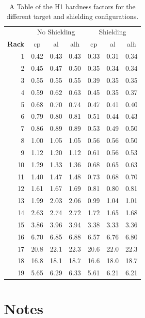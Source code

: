 \documentclass[main.tex]{subfiles}
\begin{document}
\begin{table}[htbp]
  \centering
    \begin{tabular}{r|c|c|c|c|c|c}
     & \multicolumn{3}{c|}{No Shielding} & \multicolumn{3}{c}{Shielding} \\ \cline{2-7}
    \textbf{Rack}  & cp    & al    & alh   & cp    & al    & alh \\ 
    \hline \hline
    1     & 0.42  & 0.43  & 0.43  & 0.33  & 0.31  & 0.34 \\
    2     & 0.45  & 0.47  & 0.50  & 0.35  & 0.34  & 0.34 \\
    3     & 0.55  & 0.55  & 0.55  & 0.39  & 0.35  & 0.35 \\
    4     & 0.59  & 0.62  & 0.63  & 0.45  & 0.35  & 0.37 \\
    5     & 0.68  & 0.70  & 0.74  & 0.47  & 0.41  & 0.40 \\
    6     & 0.79  & 0.80  & 0.81  & 0.51  & 0.44  & 0.43 \\
    7     & 0.86  & 0.89  & 0.89  & 0.53  & 0.49  & 0.50 \\
    8     & 1.00  & 1.05  & 1.05  & 0.56  & 0.56  & 0.50 \\
    9     & 1.12  & 1.20  & 1.12  & 0.61  & 0.56  & 0.53 \\
    10    & 1.29  & 1.33  & 1.36  & 0.68  & 0.65  & 0.63 \\
    11    & 1.40  & 1.47  & 1.48  & 0.73  & 0.68  & 0.70 \\
    12    & 1.61  & 1.67  & 1.69  & 0.81  & 0.80  & 0.81 \\
    13    & 1.99  & 2.03  & 2.06  & 0.99  & 1.04  & 1.01 \\
    14    & 2.63  & 2.74  & 2.72  & 1.72  & 1.65  & 1.68 \\
    15    & 3.86  & 3.96  & 3.94  & 3.38  & 3.33  & 3.36 \\
    16    & 6.70  & 6.85  & 6.88  & 6.57  & 6.76  & 6.80 \\
    17    & 20.8  & 22.1  & 22.3  & 20.6  & 22.0  & 22.3 \\
    18    & 16.8  & 18.1  & 18.7  & 16.6  & 18.0  & 18.7 \\
    19    & 5.65  & 6.29  & 6.33  & 5.61  & 6.21  & 6.21 \\
    \end{tabular}%
    \caption{A Table of the H1 hardness factors for the different target and shielding configurations.}
  \label{tab:addlabel}%
\end{table}%

\clearpage
\section{Notes}
\end{document}
